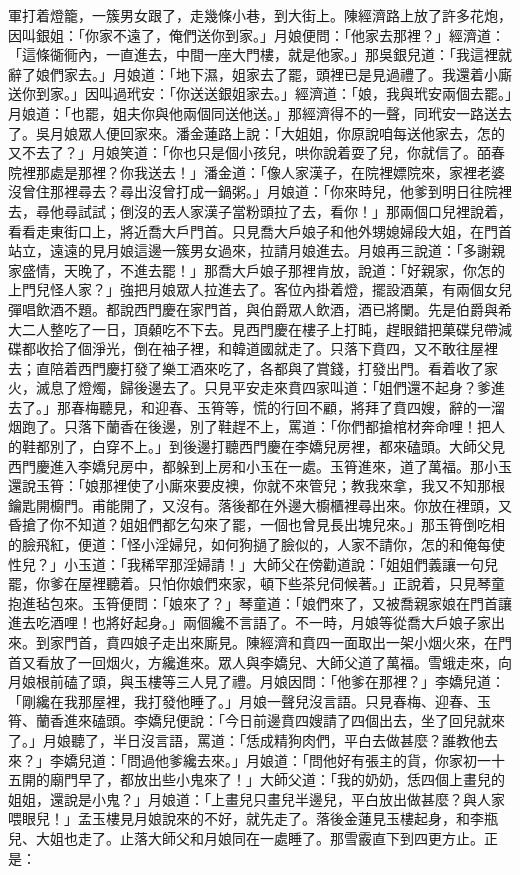 軍打着燈籠，一簇男女跟了，走幾條小巷，到大街上。陳經濟路上放了許多花炮，因叫銀姐：「你家不遠了，俺們送你到家。」月娘便問：「他家去那裡？」經濟道：「這條衚衕內，一直進去，中間一座大門樓，就是他家。」那吳銀兒道：「我這裡就辭了娘們家去。」月娘道：「地下濕，姐家去了罷，頭裡已是見過禮了。我還着小廝送你到家。」因叫過玳安：「你送送銀姐家去。」經濟道：「娘，我與玳安兩個去罷。」月娘道：「也罷，姐夫你與他兩個同送他送。」那經濟得不的一聲，同玳安一路送去了。吳月娘眾人便回家來。潘金蓮路上說：「大姐姐，你原說咱每送他家去，怎的又不去了？」月娘笑道：「你也只是個小孩兒，哄你說着耍了兒，你就信了。皕春院裡那處是那裡？你我送去！」潘金道：「像人家漢子，在院裡嫖院來，家裡老婆沒曾住那裡尋去？尋出沒曾打成一鍋粥。」月娘道：「你來時兒，他爹到明日往院裡去，尋他尋試試；倒沒的丟人家漢子當粉頭拉了去，看你！」那兩個口兒裡說着，看看走東街口上，將近喬大戶門首。只見喬大戶娘子和他外甥媳婦段大姐，在門首站立，遠遠的見月娘這邊一簇男女過來，拉請月娘進去。月娘再三說道：「多謝親家盛情，天晚了，不進去罷！」那喬大戶娘子那裡肯放，說道：「好親家，你怎的上門兒怪人家？」強把月娘眾人拉進去了。客位內掛着燈，擺設酒菓，有兩個女兒彈唱飲酒不題。都說西門慶在家門首，與伯爵眾人飲酒，酒已將闌。先是伯爵與希大二人整吃了一日，頂顙吃不下去。見西門慶在樓子上打盹，趕眼錯把菓碟兒帶減碟都收拾了個淨光，倒在袖子裡，和韓道國就走了。只落下賁四，又不敢往屋裡去；直陪着西門慶打發了樂工酒來吃了，各都與了賞錢，打發出門。看着收了家火，滅息了燈燭，歸後邊去了。只見平安走來賁四家叫道：「姐們還不起身？爹進去了。」那春梅聽見，和迎春、玉筲等，慌的行回不顧，將拜了賁四嫂，辭的一溜烟跑了。只落下蘭香在後邊，別了鞋趕不上，罵道：「你們都搶棺材奔命哩！把人的鞋都別了，白穿不上。」到後邊打聽西門慶在李嬌兒房裡，都來磕頭。大師父見西門慶進入李嬌兒房中，都躲到上房和小玉在一處。玉筲進來，道了萬福。那小玉還說玉筲：「娘那裡使了小廝來要皮襖，你就不來管兒；教我來拿，我又不知那根鑰匙開櫥門。甫能開了，又沒有。落後都在外邊大櫥櫃裡尋出來。你放在裡頭，又昏搶了你不知道？姐姐們都乞勾來了罷，一個也曾見長出塊兒來。」那玉筲倒吃相的臉飛紅，便道：「怪小淫婦兒，如何狗撾了臉似的，人家不請你，怎的和俺每使性兒？」小玉道：「我稀罕那淫婦請！」大師父在傍勸道說：「姐姐們義讓一句兒罷，你爹在屋裡聽着。只怕你娘們來家，頓下些茶兒伺候著。」正說着，只見琴童抱進毡包來。玉筲便問：「娘來了？」琴童道：「娘們來了，又被喬親家娘在門首讓進去吃酒哩！也將好起身。」兩個纔不言語了。不一時，月娘等從喬大戶娘子家出來。到家門首，賁四娘子走出來廝見。陳經濟和賁四一面取出一架小烟火來，在門首又看放了一回烟火，方纔進來。眾人與李嬌兒、大師父道了萬福。雪蛾走來，向月娘根前磕了頭，與玉樓等三人見了禮。月娘因問：「他爹在那裡？」李嬌兒道：「剛纔在我那屋裡，我打發他睡了。」月娘一聲兒沒言語。只見春梅、迎春、玉筲、蘭香進來磕頭。李嬌兒便說：「今日前邊賁四嫂請了四個出去，坐了回兒就來了。」月娘聽了，半日沒言語，罵道：「恁成精狗肉們，平白去做甚麼？誰教他去來？」李嬌兒道：「問過他爹纔去來。」月娘道：「問他好有張主的貨，你家初一十五開的廟門早了，都放出些小鬼來了！」大師父道：「我的奶奶，恁四個上畫兒的姐姐，還說是小鬼？」月娘道：「上畫兒只畫兒半邊兒，平白放出做甚麼？與人家喂眼兒！」孟玉樓見月娘說來的不好，就先走了。落後金蓮見玉樓起身，和李瓶兒、大姐也走了。止落大師父和月娘同在一處睡了。那雪霰直下到四更方止。正是：

